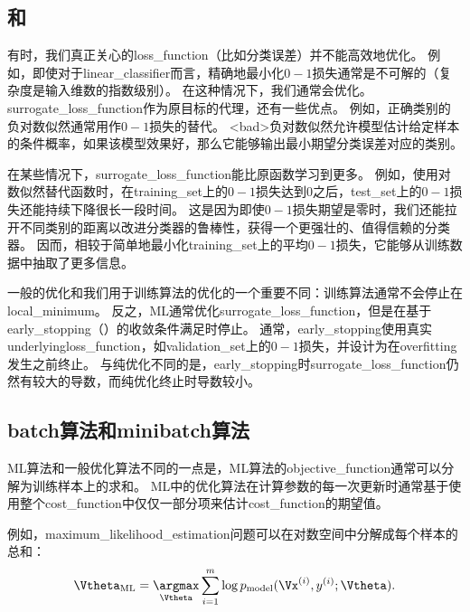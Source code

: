 \subsection{和}
\label{sec:surrogate_loss_functions_and_early_stopping}
有时，我们真正关心的\gls{loss_function}（比如分类误差）并不能高效地优化。
例如，即使对于\gls{linear_classifier}而言，精确地最小化$0-1$损失通常是不可解的（复杂度是输入维数的指数级别）\citep{Marcotte-92}。
在这种情况下，我们通常会优化。
\gls{surrogate_loss_function}作为原目标的代理，还有一些优点。  
例如，正确类别的负对数似然通常用作$0-1$损失的替代。
<bad>负对数似然允许模型估计给定样本的条件概率，如果该模型效果好，那么它能够输出最小期望分类误差对应的类别。


在某些情况下，\gls{surrogate_loss_function}能比原函数学习到更多。
例如，使用对数似然替代函数时，在\gls{training_set}上的$0-1$损失达到$0$之后，\gls{test_set}上的$0-1$损失还能持续下降很长一段时间。
这是因为即使$0-1$损失期望是零时，我们还能拉开不同类别的距离以改进分类器的鲁棒性，获得一个更强壮的、值得信赖的分类器。
因而，相较于简单地最小化\gls{training_set}上的平均$0-1$损失，它能够从训练数据中抽取了更多信息。


一般的优化和我们用于训练算法的优化的一个重要不同：训练算法通常不会停止在\gls{local_minimum}。
反之，\gls{ML}通常优化\gls{surrogate_loss_function}，但是在基于\gls{early_stopping}（）的收敛条件满足时停止。
通常，\gls{early_stopping}使用真实\gls{underlying}\gls{loss_function}，如\gls{validation_set}上的$0-1$损失，并设计为在\gls{overfitting}发生之前终止。
与纯优化不同的是，\gls{early_stopping}时\gls{surrogate_loss_function}仍然有较大的导数，而纯优化终止时导数较小。


\subsection{\gls{batch}算法和\gls{minibatch}算法}
\label{sec:batch_and_minibatch_algorithms}
\gls{ML}算法和一般优化算法不同的一点是，\gls{ML}算法的\gls{objective_function}通常可以分解为训练样本上的求和。
\gls{ML}中的优化算法在计算参数的每一次更新时通常基于使用整个\gls{cost_function}中仅仅一部分项来估计\gls{cost_function}的期望值。

例如，\gls{maximum_likelihood_estimation}问题可以在对数空间中分解成每个样本的总和：
\begin{equation}
\label{eq:8.4}
    \Vtheta_{\text{ML}} = \underset{\Vtheta}{\argmax} \sum_{i=1}^m
    \log p_{\text{model}} (\Vx^{(i)}, y^{(i)}; \Vtheta) .
\end{equation}



